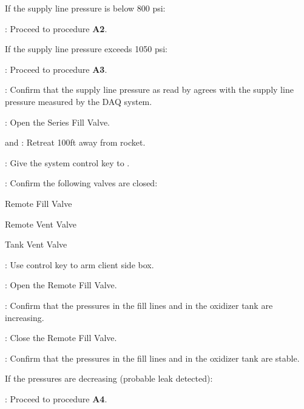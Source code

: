 \begin{checklist}
    \begin{checklist}[label=$\bullet$]
        \item If the supply line pressure is below 800 psi:
        \begin{checklist}
            \item \ops{}: Proceed to procedure \textbf{A2}.
        \end{checklist}
        \item If the supply line pressure exceeds 1050 psi:
        \begin{checklist}
            \item \ops{}: Proceed to procedure \textbf{A3}.
        \end{checklist}
    \end{checklist}
    \item \control: Confirm that the supply line pressure as read by \primary{} agrees with the supply line pressure measured by the DAQ system.
    \item \primary: Open the Series Fill Valve.
    \item \primary{} and \secondary{}: Retreat 100ft away from rocket.
    \item \ops{}: Give the system control key to \control{}.
    \item \control{}: Confirm the following valves are closed:
    \begin{checklist}
        \item Remote Fill Valve
        \item Remote Vent Valve
        \item Tank Vent Valve
    \end{checklist}
    \item \control{}: Use control key to arm client side box.
    \item \control{}: Open the Remote Fill Valve.
    \item \control{}: Confirm that the pressures in the fill lines and in the oxidizer tank are increasing.
    \item \control{}: Close the Remote Fill Valve.
    \item \control{}: Confirm that the pressures in the fill lines and in the oxidizer tank are stable.
    \begin{checklist}[label=$\bullet$]
        \item If the pressures are decreasing (probable leak detected):
        \begin{checklist}
            \item \ops{}: Proceed to procedure \textbf{A4}.

\end{checklist}
\end{checklist}
\end{checklist}
